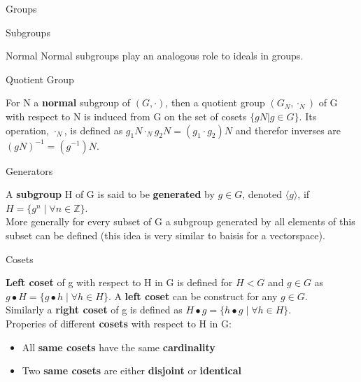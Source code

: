 \documentclass[12pt, letterpaper]{article}
\begin{document}
\begin{section}{Groups}
\begin{subsection}{Subgroups}
\begin{subsubsection}{Normal}
      Normal subgroups play an analogous role to ideals in groups.

    \end{subsubsection}

    \begin{subsubsection}{Quotient Group}

      For N a \textbf{normal} subgroup of \((G, \cdot)\), then a quotient group
      \((G_{N}, \cdot_{N})\) of G with respect to N is induced from G on the set
      of cosets \(\{ gN | g \in G \}\). Its operation, \(\cdot_{N}\), is defined as
      \(g_{1}N \cdot_{N} g_{2}N = (g_{1} \cdot g_{2})N\) and therefor inverses are
      \((gN)^{-1} = (g^{-1})N\).

    \end{subsubsection}

    \begin{subsubsection}{Generators}

      A \textbf{subgroup} H of G is said to be \textbf{generated} by \(g \in G\),
      denoted \(\langle g \rangle\), if \(H = \{ g^{n} \; | \; \forall n \in \mathbb{Z} \}\). \\
      More generally for every subset of G a subgroup generated by all elements
      of this subset can be defined (this idea is very similar to baisis for a
      vectorspace).

    \end{subsubsection}

  \end{subsection}

  \begin{subsection}{Cosets}

    \textbf{Left coset} of g with respect to H in G is defined for \(H < G\)
    and \(g \in G\) as \(g \bullet H = \{{} g \bullet h \; | \; \forall h \in H \}{}\).
    A \textbf{left coset} can be construct for any \(g \in G\). \\
    Similarly a \textbf{right coset} of g is defined as
    \(H \bullet g = \{{} h \bullet g \; | \; \forall h \in H \}{}\). \\
    Properies of different \textbf{cosets} with respect to H in G:
    \begin{itemize}
      \item All \textbf{same cosets} have the same \textbf{cardinality}
      \item Two \textbf{same cosets} are either \textbf{disjoint} or \textbf{identical}
    \end{itemize}


\end{subsection}
\end{section}
\end{document}
